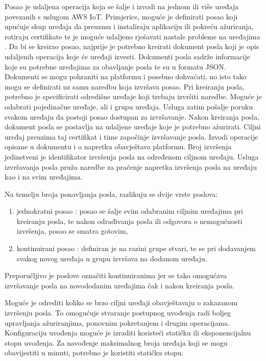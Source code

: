 Posao je udaljena operacija koja se šalje i izvodi na jednom ili više uređaja povezanih s uslugom AWS IoT. Primjerice, moguće je definirati posao koji upućuje skup uređaja da preuzmu i instaliraju aplikaciju ili pokreću ažuriranja, rotiraju certifikate te je moguće udaljeno rješavati nastale probleme na uređajima . Da bi se kreirao posao, najprije je potrebno kreirati dokument posla  koji je opis udaljenih operacija koje će uređaji izvesti. Dokumenti posla sadrže informacije koje su potrebne uređajima za obavljanje posla te su u formatu JSON. Dokumenti se mogu pohraniti na platformu i posebno dohvaćati, no isto tako mogu se definirati uz samu naredbu koja izvršava posao. Pri kreiranju posla, potrebno je specificirati odredišne uređaje  koji trebaju izvršiti naredbe. Moguće je odabrati pojedinačne uređaje, ali i grupu uređaja. Usluga zatim pošalje poruku svakom uređaju da postoji posao dostupan za izvršavanje. Nakon kreiranja posla, dokument posla se postavlja na udaljene uređaje koje je potrebno ažurirati. Ciljni uređaj preuzima taj certifikat i time započinje izvršavanje posla. Izvodi operacije opisane u dokumentu i o napretku obavještava platformu. Broj izvršenja  jedinstveni je identifikator izvršenja posla na određenom ciljnom uređaju. Usluga izvršavanja posla pruža naredbe za praćenje napretka izvršenja posla na uređaju kao i na svim uređajima. 

Na temelju broja ponavljanja posla, razlikuju se dvije vrste poslova:
\begin{enumerate}
	\item jednokratni posao : posao se šalje svim odabranim ciljnim uređajima pri kreiranju posla, te nakon odrađivanja posla ili odgovora o nemogućnosti izvršenja, posao se smatra gotovim, 
	\item kontinuirani posao : definiran je na razini grupe stvari, te se pri dodavanjem svakog novog uređaja u grupu izvršava na dodanom uređaju. 
\end{enumerate}

Preporučljivo je poslove označiti kontinuiranima jer se tako omogućava izvršavanje posla na novododanim uređajima čak i nakon kreiranja posla. 

Moguće je odrediti koliko se brzo ciljni uređaji obavještavaju o zakazanom izvršenju posla. To omogućuje stvaranje postupnog uvođenja  radi boljeg upravljanja ažuriranjima, ponovnim pokretanjem i drugim operacijama. Konfiguraciju uvođenja moguće je izraditi koristeći statičku ili eksponencijalnu stopu uvođenja. Za navođenje maksimalnog broja uređaja koji se mogu obavijestiti u minuti, potrebno je koristiti statičku stopu. 

